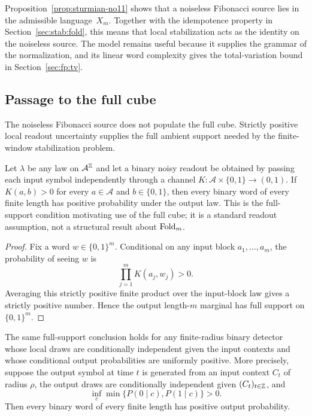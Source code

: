 \begin{remark}
Proposition~\ref{prop:sturmian-no11} shows that a noiseless Fibonacci source
lies in the admissible language~$X_m$. Together with the idempotence property
in Section~\ref{sec:stab:fold}, this means that local stabilization acts as
the identity on the noiseless source. The model remains useful because it
supplies the grammar of the normalization, and its linear word complexity
gives the total-variation bound in Section~\ref{sec:fp:tv}.
\end{remark}

\subsection{Passage to the full cube}\label{sec:readout:noise}

The noiseless Fibonacci source does not populate the full cube. Strictly positive local readout uncertainty supplies the full ambient support needed by the finite-window stabilization problem.

\begin{theorem}\label{thm:noise-full-support}
Let $\lambda$ be any law on $\mathcal A^{\mathbb{Z}}$ and let a binary noisy readout
be obtained by passing each input symbol independently through a channel
$K:\mathcal A\times\{0,1\}\to(0,1)$.  If
$K(a,b)>0$ for every $a\in\mathcal A$ and $b\in\{0,1\}$, then every binary
word of every finite length has positive probability under the output law.
This is the full-support condition motivating use of the full cube; it is a
standard readout assumption, not a structural result about $\mathrm{Fold}_m$.
\end{theorem}

\begin{proof}
Fix a word $w\in\{0,1\}^m$.  Conditional on any input block
$a_1,\ldots,a_m$, the probability of seeing $w$ is
\[
  \prod_{j=1}^m K(a_j,w_j)>0.
\]
Averaging this strictly positive finite product over the input-block law gives
a strictly positive number.  Hence the output length-$m$ marginal has full
support on $\{0,1\}^m$.
\end{proof}

\begin{proposition}\label{prop:detector-realization}
The same full-support conclusion holds for any finite-radius binary detector
whose local draws are conditionally independent given the input contexts and
whose conditional output probabilities are uniformly positive.  More
precisely, suppose the output symbol at time $t$ is generated from an input
context $C_t$ of radius $\rho$, the output draws are conditionally independent
given $(C_t)_{t\in\mathbb{Z}}$, and
\[
  \inf_{c}\min\{P(0\mid c),P(1\mid c)\}>0 .
\]
Then every binary word of every finite length has positive output probability.
\end{proposition}

